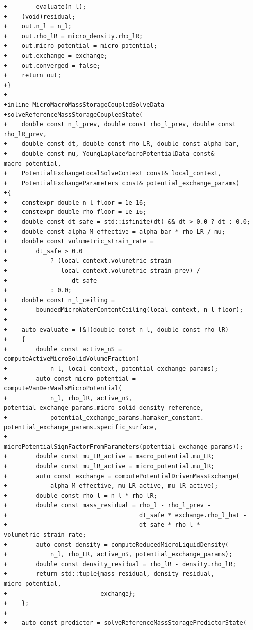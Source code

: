 \documentclass[10pt]{article}
\begin{document}
\begin{lstlisting}
+        evaluate(n_l);
+    (void)residual;
+    out.n_l = n_l;
+    out.rho_lR = micro_density.rho_lR;
+    out.micro_potential = micro_potential;
+    out.exchange = exchange;
+    out.converged = false;
+    return out;
+}
+
+inline MicroMacroMassStorageCoupledSolveData
+solveReferenceMassStorageCoupledState(
+    double const n_l_prev, double const rho_l_prev, double const rho_lR_prev,
+    double const dt, double const rho_LR, double const alpha_bar,
+    double const mu, YoungLaplaceMacroPotentialData const& macro_potential,
+    PotentialExchangeLocalSolveContext const& local_context,
+    PotentialExchangeParameters const& potential_exchange_params)
+{
+    constexpr double n_l_floor = 1e-16;
+    constexpr double rho_floor = 1e-16;
+    double const dt_safe = std::isfinite(dt) && dt > 0.0 ? dt : 0.0;
+    double const alpha_M_effective = alpha_bar * rho_LR / mu;
+    double const volumetric_strain_rate =
+        dt_safe > 0.0
+            ? (local_context.volumetric_strain -
+               local_context.volumetric_strain_prev) /
+                  dt_safe
+            : 0.0;
+    double const n_l_ceiling =
+        boundedMicroWaterContentCeiling(local_context, n_l_floor);
+
+    auto evaluate = [&](double const n_l, double const rho_lR)
+    {
+        double const active_nS = computeActiveMicroSolidVolumeFraction(
+            n_l, local_context, potential_exchange_params);
+        auto const micro_potential = computeVanDerWaalsMicroPotential(
+            n_l, rho_lR, active_nS, potential_exchange_params.micro_solid_density_reference,
+            potential_exchange_params.hamaker_constant, potential_exchange_params.specific_surface,
+            microPotentialSignFactorFromParameters(potential_exchange_params));
+        double const mu_LR_active = macro_potential.mu_LR;
+        double const mu_lR_active = micro_potential.mu_lR;
+        auto const exchange = computePotentialDrivenMassExchange(
+            alpha_M_effective, mu_LR_active, mu_lR_active);
+        double const rho_l = n_l * rho_lR;
+        double const mass_residual = rho_l - rho_l_prev -
+                                     dt_safe * exchange.rho_l_hat -
+                                     dt_safe * rho_l * volumetric_strain_rate;
+        auto const density = computeReducedMicroLiquidDensity(
+            n_l, rho_LR, active_nS, potential_exchange_params);
+        double const density_residual = rho_lR - density.rho_lR;
+        return std::tuple{mass_residual, density_residual, micro_potential,
+                          exchange};
+    };
+
+    auto const predictor = solveReferenceMassStoragePredictorState(

\end{lstlisting}
\end{document}

